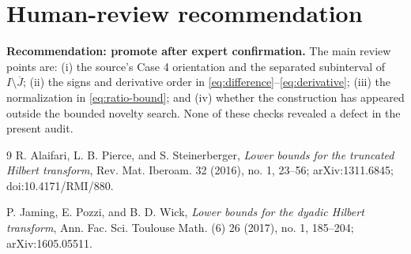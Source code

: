 \documentclass[11pt]{article}
\begin{document}
\section{Human-review recommendation}

\textbf{Recommendation: promote after expert confirmation.}  The main review
points are: (i) the source's Case 4 orientation and the separated subinterval
of $I\setminus\overline J$; (ii) the signs and derivative order in
\eqref{eq:difference}--\eqref{eq:derivative}; (iii) the normalization in
\eqref{eq:ratio-bound}; and (iv) whether the construction has appeared outside
the bounded novelty search.  None of these checks revealed a defect in the
present audit.

\begin{thebibliography}{9}
R. Alaifari, L. B. Pierce, and S. Steinerberger,
\emph{Lower bounds for the truncated Hilbert transform},
Rev. Mat. Iberoam. 32 (2016), no. 1, 23--56;
arXiv:1311.6845; doi:10.4171/RMI/880.

P. Jaming, E. Pozzi, and B. D. Wick,
\emph{Lower bounds for the dyadic Hilbert transform},
Ann. Fac. Sci. Toulouse Math. (6) 26 (2017), no. 1, 185--204;
arXiv:1605.05511.
\end{thebibliography}
\end{document}
